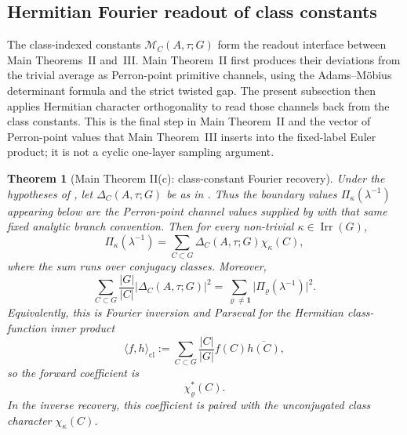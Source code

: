 \documentclass[11pt,a4paper]{amsart}
\theoremstyle{plain}
\newtheorem{theorem}{Theorem}[section]
\theoremstyle{definition}
\theoremstyle{remark}
\DeclareMathOperator{\Irr}{Irr}
\newcommand{\abs}[1]{\lvert #1 \rvert}
\begin{document}
\subsection{Hermitian Fourier readout of class constants}

The class-indexed constants \(\mathcal M_C(A,\tau;G)\) form the readout
interface between Main Theorems~II and~III.  Main Theorem~II first produces
their deviations from the trivial average as Perron-point primitive channels,
using the Adams--M\"obius determinant formula and the strict twisted gap.
The present subsection then applies Hermitian character orthogonality to read
those channels back from the class constants.  This is the final step in Main
Theorem~II and the vector of Perron-point values that Main Theorem~III inserts
into the fixed-label Euler product; it is not a cyclic one-layer sampling
argument.

\begin{theorem}[Main Theorem II(c): class-constant Fourier recovery]
  \label{thm:class-mertens-fourier}
  Under the hypotheses of , let
  \(\Delta_C(A,\tau;G)\) be as in .
  Thus the boundary values \(\Pi_\kappa(\lambda^{-1})\) appearing below
  are the Perron-point channel values supplied by
   with that same fixed analytic
  branch convention.
  Then
  for every non-trivial \(\kappa\in\Irr(G)\),
  \begin{equation}\label{eq:class-mertens-fourier-inversion}
    \Pi_\kappa(\lambda^{-1})
    =
    \sum_{C\subset G}\Delta_C(A,\tau;G)\chi_\kappa(C),
  \end{equation}
  where the sum runs over conjugacy classes. Moreover,
  \begin{equation}\label{eq:class-mertens-plancherel}
    \sum_{C\subset G}\frac{|G|}{|C|}\abs{\Delta_C(A,\tau;G)}^2
    =
    \sum_{\varrho\neq\mathbf 1}
      \abs{\Pi_\varrho(\lambda^{-1})}^2.
  \end{equation}
  Equivalently, this is Fourier inversion and Parseval for the Hermitian
  class-function inner product
  \[
    \langle f,h\rangle_{\mathrm{cl}}
    :=
    \sum_{C\subset G}\frac{|C|}{|G|}f(C)\overline{h(C)},
  \]
  so the forward coefficient is
  \[
    \chi_\varrho^\ast(C).
  \]
  In the inverse recovery, this coefficient is paired with the
  unconjugated class character \(\chi_\kappa(C)\).
\end{theorem}
\end{document}
